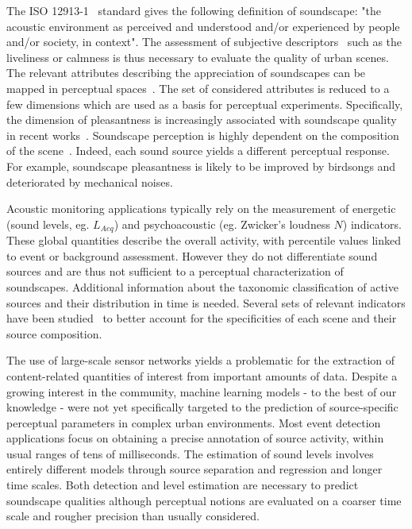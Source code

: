 \documentclass{article}
\begin{document}
\begin{sloppy}
The ISO 12913-1~\cite{iso2014} standard gives the following definition of soundscape: "the acoustic environment as perceived and understood and/or experienced by people and/or society, in context". The assessment of subjective descriptors~\cite{berglund2006, brown2011, aletta2016} such as the liveliness or calmness is thus necessary to evaluate the quality of urban scenes. The relevant attributes describing the appreciation of soundscapes can be mapped in perceptual spaces~\cite{axelsson2010, cain2013}. The set of considered attributes is reduced to a few dimensions which are used as a basis for perceptual experiments. Specifically, the dimension of pleasantness is increasingly associated with soundscape quality in recent works~\cite{decoensel2006, delaitre2014, ricciardi2014, aumond2017}. Soundscape perception is highly dependent on the composition of the scene~\cite{lavandier2006, nilsson2006}. Indeed, each sound source yields a different perceptual response. For example, soundscape pleasantness is likely to be improved by birdsongs and deteriorated by mechanical noises.

Acoustic monitoring applications typically rely on the measurement of energetic (sound levels, eg. $L_{Aeq}$) and psychoacoustic (eg. Zwicker's loudness $N$) indicators. These global quantities describe the overall activity, with percentile values linked to event or background assessment. However they do not differentiate sound sources and are thus not sufficient to a perceptual characterization of soundscapes. Additional information about the taxonomic classification of active sources and their distribution in time is needed. Several sets of relevant indicators have been studied~\cite{can2008, can2016, brocolini2013} to better account for the specificities of each scene and their source composition.

The use of large-scale sensor networks yields a problematic for the extraction of content-related quantities of interest from important amounts of data. Despite a growing interest in the community, machine learning models - to the best of our knowledge - were not yet specifically targeted to the prediction of source-specific perceptual parameters in complex urban environments. Most event detection applications focus on obtaining a precise annotation of source activity, within usual ranges of tens of milliseconds. The estimation of sound levels involves entirely different models through source separation and regression \cite{gloaguen2016} and longer time scales. Both detection and level estimation are necessary to predict soundscape qualities although perceptual notions are evaluated on a coarser time scale and rougher precision than usually considered.


\end{sloppy}
\end{document}
